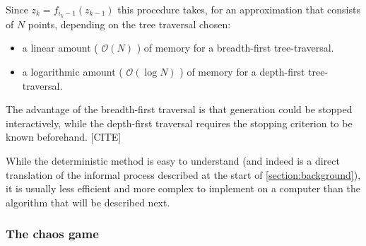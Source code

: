\documentclass[11pt]{article}
\begin{document}
Since \(z_{k} = f_{i_k-1}(z_{k-1})\) this procedure takes, for an approximation that consists of \(N\) points, depending on the tree traversal chosen:

\begin{itemize}
\item a linear amount ( \(\mathcal{O}(N)\) ) of memory  for a breadth-first tree-traversal.
\item a logarithmic amount ( \(\mathcal{O}(\log{N})\) ) of memory for a depth-first tree-traversal.
\end{itemize}

The advantage of the breadth-first traversal is that generation could be stopped interactively,
while the depth-first traversal requires the stopping criterion to be known beforehand. [CITE]

While the deterministic method is easy to understand (and indeed is a direct translation of the informal process described at the start of \autoref{section:background}),
it is usually less efficient and more complex to implement on a computer than the algorithm that will be described next.

\subsubsection{The chaos game}
\label{sec:org33fd212}
\label{subsection:chaos_game}
\end{document}
